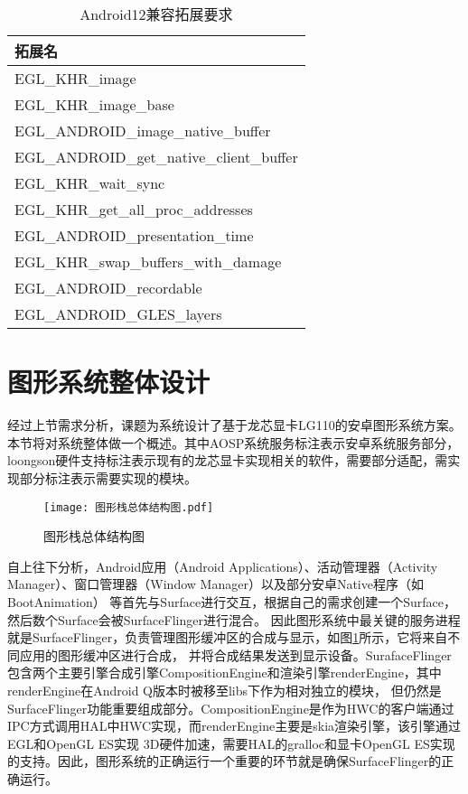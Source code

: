 \begin{table}[h]
  \centering
  \caption{Android12兼容拓展要求}
  \label{tab:Android12兼容拓展要求}
  \begin{tabular}{l}
    \toprule
    拓展名  \\
    \midrule
    EGL\_KHR\_image \\
    EGL\_KHR\_image\_base \\
    EGL\_ANDROID\_image\_native\_buffer \\
    EGL\_ANDROID\_get\_native\_client\_buffer \\
    EGL\_KHR\_wait\_sync \\
    EGL\_KHR\_get\_all\_proc\_addresses \\
    EGL\_ANDROID\_presentation\_time \\
    EGL\_KHR\_swap\_buffers\_with\_damage \\
    EGL\_ANDROID\_recordable \\
    EGL\_ANDROID\_GLES\_layers \\
    \bottomrule
  \end{tabular}
  \note{}
\end{table}

\section{图形系统整体设计}
经过上节需求分析，课题为系统设计了基于龙芯显卡LG110的安卓图形系统方案。本节将对系统整体做一个概述。其中AOSP系统服务标注表示安卓系统服务部分，
loongson硬件支持标注表示现有的龙芯显卡实现相关的软件，需要部分适配，需实现部分标注表示需要实现的模块。

\begin{figure}[h]
  \centering
  \texttt{[image: 图形栈总体结构图.pdf]}
  \caption{图形栈总体结构图}    
  \label{fig:图形栈总体结构图}
\end{figure}

自上往下分析，Android应用（Android Applications）、活动管理器（Activity Manager）、窗口管理器（Window Manager）以及部分安卓Native程序（如BootAnimation）
等首先与Surface进行交互，根据自己的需求创建一个Surface，然后数个Surface会被SurfaceFlinger进行混合\cite{邓凡平2011深入理解}。
因此图形系统中最关键的服务进程就是SurfaceFlinger，负责管理图形缓冲区的合成与显示，如图\ref{fig:图形栈总体结构图}所示，它将来自不同应用的图形缓冲区进行合成，
并将合成结果发送到显示设备。SurafaceFlinger包含两个主要引擎合成引擎CompositionEngine和渲染引擎renderEngine，其中renderEngine在Android Q版本时被移至libs下作为相对独立的模块，
但仍然是SurfaceFlinger功能重要组成部分。CompositionEngine是作为HWC的客户端通过IPC方式调用HAL中HWC实现，而renderEngine主要是skia渲染引擎，该引擎通过EGL和OpenGL ES实现
3D硬件加速，需要HAL的gralloc和显卡OpenGL ES实现的支持。因此，图形系统的正确运行一个重要的环节就是确保SurfaceFlinger的正确运行。

